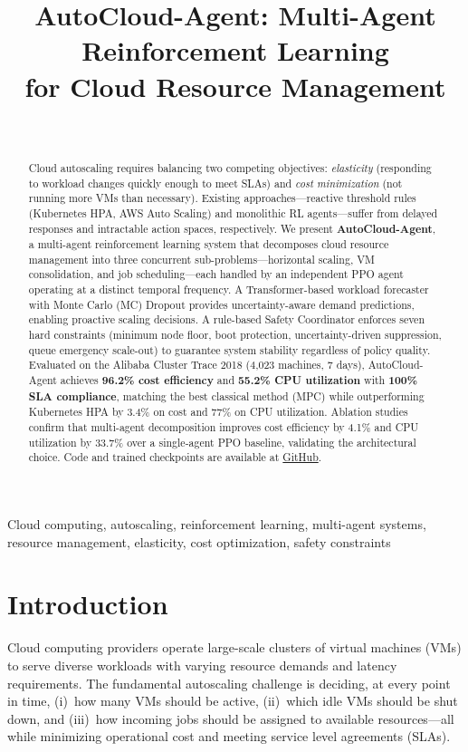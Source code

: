\documentclass[conference]{IEEEtran}
\title{AutoCloud-Agent: Multi-Agent Reinforcement Learning\\for Cloud Resource Management}
\author{
    \IEEEauthorblockN{
        \begin{tabular}{c @{\hskip 0.5in} c @{\hskip 0.5in} c}
            K Chaitanya & Rahul K & S.L.R. Siddesh Devarakonda \\
            (25CS60R28) & (25CS60R16) & (25CS60R80)
        \end{tabular}
    }
    \\[0.3cm]
    \IEEEauthorblockA{
        Department of Computer Science and Engineering\\
        Indian Institute of Technology Kharagpur\\
        April 2026
    }
}
\begin{document}
\maketitle

\begin{abstract}
Cloud autoscaling requires balancing two competing objectives: \textit{elasticity}
(responding to workload changes quickly enough to meet SLAs) and \textit{cost
minimization} (not running more VMs than necessary). Existing approaches---reactive
threshold rules (Kubernetes HPA, AWS Auto Scaling) and monolithic RL
agents---suffer from delayed responses and intractable action spaces,
respectively. We present \textbf{AutoCloud-Agent}, a multi-agent reinforcement
learning system that decomposes cloud resource management into three concurrent
sub-problems---horizontal scaling, VM consolidation, and job scheduling---each
handled by an independent PPO agent operating at a distinct temporal frequency.
A Transformer-based workload forecaster with Monte Carlo (MC) Dropout provides
uncertainty-aware demand predictions, enabling proactive scaling decisions.
A rule-based Safety Coordinator enforces seven hard constraints (minimum node
floor, boot protection, uncertainty-driven suppression, queue emergency
scale-out) to guarantee system stability regardless of policy quality.
Evaluated on the Alibaba Cluster Trace 2018 (4,023 machines, 7 days),
AutoCloud-Agent achieves \textbf{96.2\% cost efficiency} and \textbf{55.2\% CPU
utilization} with \textbf{100\% SLA compliance}, matching the best classical
method (MPC) while outperforming Kubernetes HPA by 3.4\% on cost and 77\% on
CPU utilization.  Ablation studies confirm that multi-agent decomposition
improves cost efficiency by 4.1\% and CPU utilization by 33.7\% over a
single-agent PPO baseline, validating the architectural choice.
Code and trained checkpoints are available at
\href{https://github.com/devchaitanya/Autocloud-agent}{GitHub}.
\end{abstract}

\begin{IEEEkeywords}
Cloud computing, autoscaling, reinforcement learning, multi-agent systems,
resource management, elasticity, cost optimization, safety constraints
\end{IEEEkeywords}

\section{Introduction}

Cloud computing providers operate large-scale clusters of virtual machines (VMs)
to serve diverse workloads with varying resource demands and latency
requirements. The fundamental autoscaling challenge is deciding, at every point
in time, (i)~how many VMs should be active, (ii)~which idle VMs should be shut
down, and (iii)~how incoming jobs should be assigned to available
resources---all while minimizing operational cost and meeting service level
agreements (SLAs).
\end{document}
